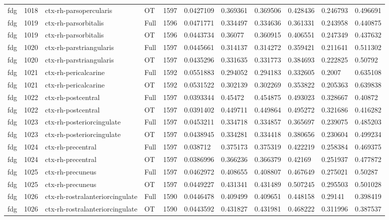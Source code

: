 \begin{landscape}
\begin{longtable}{lllllllllll}
fdg & 1018 & ctx-rh-parsopercularis & OT & 1597 & 0.0427109 & 0.369361 & 0.369506 & 0.428436 & 0.246793 & 0.496691 \\
fdg & 1019 & ctx-rh-parsorbitalis & Full & 1596 & 0.0471771 & 0.334497 & 0.334636 & 0.361331 & 0.243958 & 0.440875 \\
fdg & 1019 & ctx-rh-parsorbitalis & OT & 1596 & 0.0443734 & 0.36077 & 0.360915 & 0.406551 & 0.247349 & 0.437632 \\
fdg & 1020 & ctx-rh-parstriangularis & Full & 1597 & 0.0445661 & 0.314137 & 0.314272 & 0.359421 & 0.211641 & 0.511302 \\
fdg & 1020 & ctx-rh-parstriangularis & OT & 1597 & 0.0435296 & 0.331635 & 0.331773 & 0.384693 & 0.222825 & 0.50792 \\
fdg & 1021 & ctx-rh-pericalcarine & Full & 1592 & 0.0551883 & 0.294052 & 0.294183 & 0.332605 & 0.2007 & 0.635108 \\
fdg & 1021 & ctx-rh-pericalcarine & OT & 1592 & 0.0531522 & 0.302139 & 0.302269 & 0.353822 & 0.205363 & 0.639838 \\
fdg & 1022 & ctx-rh-postcentral & Full & 1597 & 0.0393344 & 0.45472 & 0.454875 & 0.493023 & 0.328667 & 0.40872 \\
fdg & 1022 & ctx-rh-postcentral & OT & 1597 & 0.0391402 & 0.449711 & 0.449864 & 0.495272 & 0.321686 & 0.416282 \\
fdg & 1023 & ctx-rh-posteriorcingulate & Full & 1597 & 0.0453211 & 0.334718 & 0.334857 & 0.365697 & 0.239075 & 0.485203 \\
fdg & 1023 & ctx-rh-posteriorcingulate & OT & 1597 & 0.0438945 & 0.334281 & 0.334418 & 0.380656 & 0.230604 & 0.499234 \\
fdg & 1024 & ctx-rh-precentral & Full & 1597 & 0.038712 & 0.375173 & 0.375319 & 0.422219 & 0.258384 & 0.469375 \\
fdg & 1024 & ctx-rh-precentral & OT & 1597 & 0.0386996 & 0.366236 & 0.366379 & 0.42169 & 0.251937 & 0.477872 \\
fdg & 1025 & ctx-rh-precuneus & Full & 1597 & 0.0462972 & 0.408655 & 0.408807 & 0.467649 & 0.275021 & 0.50287 \\
fdg & 1025 & ctx-rh-precuneus & OT & 1597 & 0.0449227 & 0.431341 & 0.431489 & 0.507245 & 0.295503 & 0.501028 \\
fdg & 1026 & ctx-rh-rostralanteriorcingulate & Full & 1590 & 0.0446478 & 0.409499 & 0.409651 & 0.448158 & 0.29141 & 0.398419 \\
fdg & 1026 & ctx-rh-rostralanteriorcingulate & OT & 1590 & 0.0443592 & 0.431827 & 0.431981 & 0.468222 & 0.311996 & 0.387537 \\

\end{longtable}
\end{landscape}
